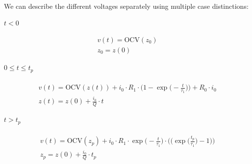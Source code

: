 We can describe the different voltages separately using multiple case distinctions:

\paragraph{$t < 0$}
\begin{equation} \label{eq:thev11}
\begin{gathered} 
v(t) = \text{OCV}(z_0) \\
z_0 = z(0) 
\end{gathered}
\end{equation}

\paragraph{$0 \leq t \leq t_p$}
\begin{equation} \label{eq:thev12}
\begin{gathered} 
v(t) = \text{OCV}(z(t)) + i_0 \cdot R_1 \cdot \bigg(1 - \exp{\bigg(-\frac{t}{\tau_1}\bigg)}\bigg) + R_0 \cdot i_0 \\
z(t) = z(0) + \frac{i_0}{Q} \cdot t
\end{gathered}
\end{equation}

\paragraph{$t > t_p$}
\begin{equation} \label{eq:thev13}
\begin{gathered} 
v(t)  = \text{OCV}(z_p) + i_0 \cdot R_1 \cdot \exp{\bigg(-\frac{t}{\tau_1}\bigg)} \cdot
\bigg(\bigg(\exp{\bigg(\frac{t_p}{\tau_1}\bigg)} - 1\bigg)\bigg) \\
z_p = z(0) + \frac{i_0}{Q} \cdot t_p 
\end{gathered}
\end{equation}

